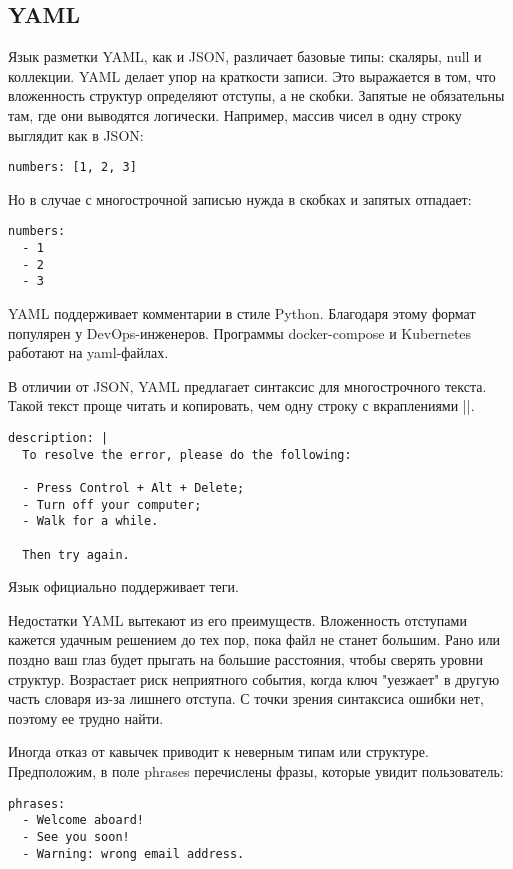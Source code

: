 \subsection{YAML}

Язык разметки YAML, как и JSON, различает базовые типы: скаляры, null и
коллекции. YAML делает упор на краткости записи. Это выражается в том, что
вложенность структур определяют отступы, а не скобки. Запятые не обязательны
там, где они выводятся логически. Например, массив чисел в одну строку выглядит
как в JSON:

\begin{verbatim}
numbers: [1, 2, 3]
\end{verbatim}

Но в случае с многострочной записью нужда в скобках и запятых отпадает:

\begin{verbatim}
numbers:
  - 1
  - 2
  - 3
\end{verbatim}

YAML поддерживает комментарии в стиле Python. Благодаря этому формат популярен у
DevOps-инженеров. Программы docker-compose и Kubernetes работают на yaml-файлах.

В отличии от JSON, YAML предлагает синтаксис для многострочного текста. Такой
текст проще читать и копировать, чем одну строку с вкраплениями \spverb|\n|.

\begin{verbatim}
description: |
  To resolve the error, please do the following:

  - Press Control + Alt + Delete;
  - Turn off your computer;
  - Walk for a while.

  Then try again.
\end{verbatim}

Язык официально поддерживает теги.

Недостатки YAML вытекают из его преимуществ. Вложенность отступами кажется
удачным решением до тех пор, пока файл не станет большим. Рано или поздно ваш
глаз будет прыгать на большие расстояния, чтобы сверять уровни
структур. Возрастает риск неприятного события, когда ключ "уезжает" в другую
часть словаря из-за лишнего отступа. С точки зрения синтаксиса ошибки нет,
поэтому ее трудно найти.

Иногда отказ от кавычек приводит к неверным типам или структуре. Предположим, в
поле phrases перечислены фразы, которые увидит пользователь:

\begin{verbatim}
phrases:
  - Welcome aboard!
  - See you soon!
  - Warning: wrong email address.
\end{verbatim}


